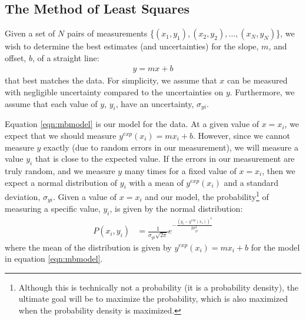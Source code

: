 
\subsection{The Method of Least Squares}
Given a set of $N$ pairs of measurements \{$(x_1,y_1), (x_2,y_2), \dots, (x_N,y_N)$\}, we wish to determine the best estimates (and uncertainties) for the slope, $m$, and offset, $b$, of a straight line:
\begin{align}
\label{eqn:mbmodel}
y=mx+b
\end{align}
that best matches the data. For simplicity, we assume that $x$ can be measured with negligible uncertainty compared to the uncertainties on $y$. Furthermore, we assume that each value of $y$, $y_i$, have an uncertainty, $\sigma_{yi}$.

Equation \ref{eqn:mbmodel} is our model for the data. At a given value of $x=x_i$, we expect that we should measure $y^{exp}(x_i)=mx_i+b$. However, since we cannot measure $y$ exactly (due to random errors in our measurement), we will measure a value $y_i$ that is close to the expected value. If the errors in our measurement are truly random, and we measure $y$ many times for a fixed value of $x=x_i$, then we expect a normal distribution of $y_i$ with a mean of $y^{exp}(x_i)$ and a standard deviation, $\sigma_{yi}$. Given a value of $x=x_i$ and our model, the probability\footnote{Although this is technically not a probability (it is a probability density), the ultimate goal will be to maximize the probability, which is also maximized when the probability density is maximized.} of measuring a specific value, $y_i$, is given by the normal distribution:
\begin{align}
P(x_i,y_i)&=\frac{1}{\sigma_{yi}\sqrt{2\pi}}e^{-\frac{(y_i-y^{exp}(x_i))^2}{2\sigma_{yi}^2}}
\end{align}
where the mean of the distribution is given by $y^{exp}(x_i)=mx_i+b$ for the model in equation \ref{eqn:mbmodel}.

